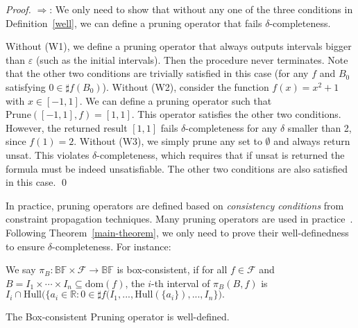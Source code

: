 \documentclass[prodmode]{acmsmall} %
\newcommand{\dom}{\mathrm{dom}}
\begin{document}
\begin{proof}
$\Rightarrow$: We only need to show that without any one of the three conditions in Definition~\ref{well}, we can define a pruning operator that fails $\delta$-completeness. 

Without (W1), we define a pruning operator that always outputs intervals bigger than $\varepsilon$ (such as the initial intervals). Then the procedure never terminates. Note that the other two conditions are trivially satisfied in this case (for any $f$ and $B_0$ satisfying $0\in \sharp f(B_0)$). Without (W2), consider the function $f(x)=x^2+1$ with $x\in [-1,1]$. We can define a pruning operator such that $\mathrm{Prune}([-1,1],f) = [1,1]$. This operator satisfies the other two conditions. However, the returned result $[1,1]$ fails $\delta$-completeness for any $\delta$ smaller than 2, since $f(1) = 2$. Without (W3), we simply prune any set to $\emptyset$ and always return {\sf unsat}. This violates $\delta$-completeness, which requires that if {\sf unsat} is returned the formula must be indeed unsatisfiable. The other two conditions are also satisfied in this case.  
\qed
\end{proof}

In practice, pruning operators are defined based on {\em consistency conditions} from constraint propagation techniques. Many pruning operators are used in practice~\cite{handbookICP}. Following Theorem~\ref{main-theorem}, we only need to prove their well-definedness to ensure $\delta$-completeness. For instance:
\begin{definition}
We say $\pi_B: \mathbb{BF}\times\mathcal{F}\rightarrow \mathbb{BF}$ is box-consistent, if for all $f\in \mathcal{F}$ and $B= I_1\times \cdots \times I_n \subseteq \dom(f)$, the $i$-th interval of $\pi_B(B,f)$ is $I_i\cap \mathrm{Hull}\big(\{a_i\in \mathbb{R}: 0\in \sharp f(I_1,...,\mathrm{Hull}(\{a_i\}),..., I_n\}\big).$
\end{definition}
\begin{proposition}
The Box-consistent Pruning operator is well-defined.
\end{proposition}
\end{document}
